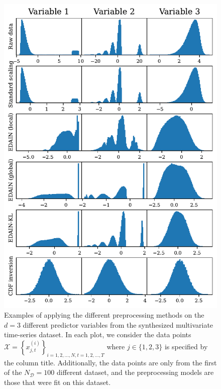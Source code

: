\documentclass{statsmsc}
\begin{document}
{%
\begin{figure}
    \begin{center}
        \includegraphics[scale=1]{figures/synthetic_data_example_transformations.pdf}
    \end{center}
    \caption{%
        Examples of applying the different preprocessing methods on the $d=3$ different
        predictor variables from the synthesized multivariate time-series dataset.
        In each plot, we consider the data points
        $\mathcal{X}=\left\{x^{(i)}_{j,t}\right\}_{i=1,2,\dots,N,t=1,2,\dots,T}$ where
        $j \in \{1,2,3\}$ is specified by the column title.
        Additionally, the data points are only from the first of the
        $N_{\mathcal{D}}=100$ different dataset, and the preprocessing models are those that were
        fit on this dataset.
    }
    \label{fig:synth_examples}
\end{figure}

}
\end{document}
